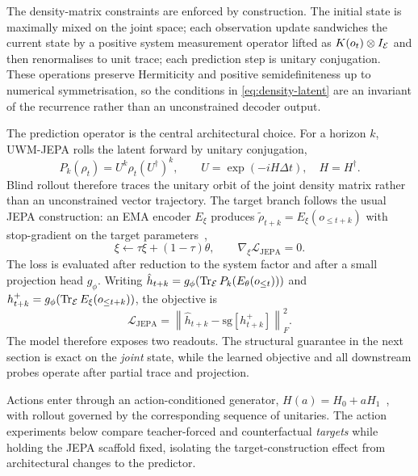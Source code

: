 The density-matrix constraints are enforced by construction. The
initial state is maximally mixed on the joint space; each observation
update sandwiches the current state by a positive system measurement
operator lifted as $K(o_t)\otimes I_{\mathcal{E}}$ and then renormalises to
unit trace; each prediction step is unitary conjugation. These
operations preserve Hermiticity and positive semidefiniteness up to
numerical symmetrisation, so the conditions in
\cref{eq:density-latent} are an invariant of the recurrence rather
than an unconstrained decoder output.

The prediction operator is the central architectural choice. For a
horizon $k$, UWM-JEPA rolls the latent forward by unitary conjugation,
\begin{equation}
  P_k(\rho_t)=U^k\rho_t(U^\dagger)^k,
  \qquad
  U=\exp(-iH\Delta t),\quad H=H^\dagger.
  \label{eq:predictor}
\end{equation}
Blind rollout therefore traces the unitary orbit of the joint density
matrix rather than an unconstrained vector trajectory. The target
branch follows the usual JEPA construction: an EMA encoder $E_\xi$
produces $\tilde\rho_{t+k}=E_\xi(o_{\le t+k})$ with stop-gradient on
the target parameters~\cite{grill2020bootstrap,tarvainen2017mean,caron2021emerging,chen2021exploring},
\begin{equation}
  \xi \leftarrow \tau \xi + (1-\tau)\theta,
  \qquad
  \nabla_\xi \mathcal{L}_{\mathrm{JEPA}}=0.
  \label{eq:ema-target}
\end{equation}
The loss is evaluated after reduction to the system factor and after a
small projection head $g_\phi$. Writing
$\hat h_{t+k}=g_\phi(\operatorname{Tr}_{\mathcal{E}}P_k(E_\theta(o_{\le t})))$ and
$h^+_{t+k}=g_\phi(\operatorname{Tr}_{\mathcal{E}}E_\xi(o_{\le t+k}))$, the objective is
\begin{equation}
  \mathcal{L}_{\mathrm{JEPA}}
  =
  \left\|
  \hat h_{t+k}-\mathrm{sg}\!\left[h^+_{t+k}\right]
  \right\|_F^2 .
  \label{eq:jepa-loss}
\end{equation}
The model therefore exposes two readouts. The structural guarantee
in the next section is exact on the \emph{joint} state, while the
learned objective and all downstream probes operate after partial
trace and projection.

Actions enter through an action-conditioned generator,
$H(a)=H_0+aH_1$~\cite{horowitz2022quantum,greydanus2019hamiltonian},
with rollout governed by the corresponding sequence of unitaries. The
action experiments below compare teacher-forced and counterfactual
\emph{targets} while holding the JEPA scaffold fixed, isolating the
target-construction effect from architectural changes to the predictor.
